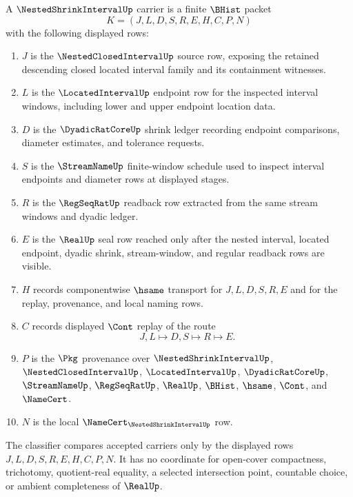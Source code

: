 \begin{definition}
\label{def:nested-shrink-interval-carrier}
A $\NestedShrinkIntervalUp$ carrier is a finite $\BHist$ packet
$$
K=(J,L,D,S,R,E,H,C,P,N)
$$
with the following displayed rows:
\begin{enumerate}
\item $J$ is the $\NestedClosedIntervalUp$ source row, exposing the retained descending closed located interval family and its containment witnesses.
\item $L$ is the $\LocatedIntervalUp$ endpoint row for the inspected interval windows, including lower and upper endpoint location data.
\item $D$ is the $\DyadicRatCoreUp$ shrink ledger recording endpoint comparisons, diameter estimates, and tolerance requests.
\item $S$ is the $\StreamNameUp$ finite-window schedule used to inspect interval endpoints and diameter rows at displayed stages.
\item $R$ is the $\RegSeqRatUp$ readback row extracted from the same stream windows and dyadic ledger.
\item $E$ is the $\RealUp$ seal row reached only after the nested interval, located endpoint, dyadic shrink, stream-window, and regular readback rows are visible.
\item $H$ records componentwise $\hsame$ transport for $J,L,D,S,R,E$ and for the replay, provenance, and local naming rows.
\item $C$ records displayed $\Cont$ replay of the route
$$
J,L \longmapsto D,S \longmapsto R \longmapsto E .
$$
\item $P$ is the $\Pkg$ provenance over $\NestedShrinkIntervalUp$, $\NestedClosedIntervalUp$, $\LocatedIntervalUp$, $\DyadicRatCoreUp$, $\StreamNameUp$, $\RegSeqRatUp$, $\RealUp$, $\BHist$, $\hsame$, $\Cont$, and $\NameCert$.
\item $N$ is the local $\NameCert_{\NestedShrinkIntervalUp}$ row.
\end{enumerate}
The classifier compares accepted carriers only by the displayed rows $J,L,D,S,R,E,H,C,P,N$. It has no coordinate for open-cover compactness, trichotomy, quotient-real equality, a selected intersection point, countable choice, or ambient completeness of $\RealUp$.
\end{definition}

